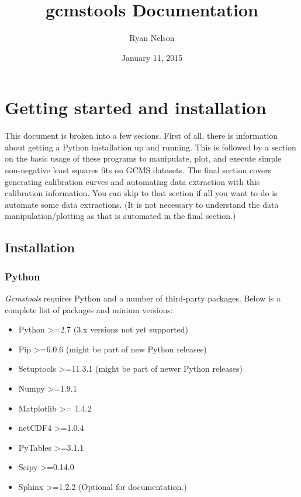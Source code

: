 \documentclass[letterpaper,10pt,english]{sphinxmanual}
\title{gcmstools Documentation}
\date{January 11, 2015}
\author{Ryan Nelson}
\begin{document}
\maketitle
\tableofcontents
{}\label{index::doc}



\chapter{Getting started and installation}
\label{intro::doc}\label{intro:gcmstools-documentation}\label{intro:getting-started-and-installation}
This document is broken into a few secions. First of all, there is information
about getting a Python installation up and running. This is followed by a
section on the basic usage of these programs to manipulate, plot, and execute
simple non-negative least squares fits on GCMS datasets. The final section
covers generating calibration curves and automating data extraction with this
calibration information. You can skip to that section if all you want to do is
automate some data extractions. (It is not necessary to understand the data
manipulation/plotting as that is automated in the final section.)


\section{Installation}
\label{intro:installation}

\subsection{Python}
\label{intro:python}
\emph{Gcmstools} requires Python and a number of third-party packages. Below is a
complete list of packages and minium versions:
\begin{itemize}
\item {} 
Python \textgreater{}=2.7 (3.x versions not yet supported)

\item {} 
Pip \textgreater{}=6.0.6 (might be part of new Python releases)

\item {} 
Setuptools \textgreater{}=11.3.1 (might be part of newer Python releases)

\item {} 
Numpy \textgreater{}=1.9.1

\item {} 
Matplotlib \textgreater{}= 1.4.2

\item {} 
netCDF4 \textgreater{}=1.0.4

\item {} 
PyTables \textgreater{}=3.1.1

\item {} 
Scipy \textgreater{}=0.14.0

\item {} 
Sphinx \textgreater{}=1.2.2 (Optional for documentation.)

\end{itemize}
\end{document}
